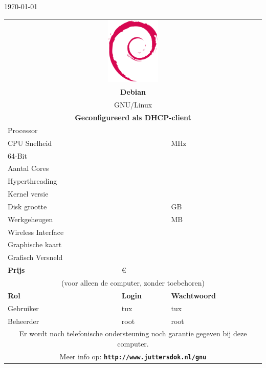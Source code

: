 \documentclass[a4paper,14pt]{extarticle}
\begin{document}

\centerline{\today}
\vskip 0.5cm
\begin{center}
	\begin{tabular}{ |p{6cm}| p{6cm}| l| }
	\multicolumn{3}{c}{\includegraphics[width=0.2\textwidth]{swirl}} \\
	\multicolumn{3}{c}{\Huge\bf{Debian \debiancode{} \debianversion}}\\
	\multicolumn{3}{c}{\LARGE{GNU/Linux}}\\
	\multicolumn{3}{c}{\bf Geconfigureerd als DHCP-client}\\
	\hline
	Processor & \multicolumn{2}{l|}{\cpumodel{}}  \\
	CPU Snelheid & \cpuspeed{} & MHz \\
	64-Bit & \bitssixtyfour{} & \\
	Aantal Cores & \corecount{} & \\
	Hyperthreading & \hyperthreading{} & \\
	Kernel versie & {} & \\
	Disk grootte & \disksize{} & GB \\
	Werkgeheugen & \memsize{} & MB \\
	Wireless Interface & \wireless & \\
	Graphische kaart & \multicolumn{2}{l|}{\graphics{}}  \\
	Grafisch Versneld & \accelerated{} & \\
	\hline
	{\bf Prijs}		& \euro{}{\price{}} &  \\
	\hline
	\multicolumn{3}{|c|}{(voor alleen de computer, zonder toebehoren)}\\
	\hline
	\hline
	\textbf{Rol} & \textbf{Login} & \textbf{Wachtwoord} \\
	\hline
	Gebruiker    & tux            & tux \\
	Beheerder    & root					  & root \\
	\hline
	\multicolumn{3}{c}{Er wordt noch telefonische ondersteuning noch garantie gegeven bij deze computer.}\\
	\multicolumn{3}{c}{Meer info op: \textbf{\texttt{http://www.juttersdok.nl/gnu}}}\\

\end{tabular}
\end{center}
\end{document}
